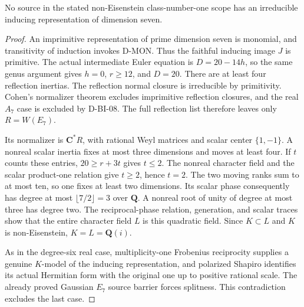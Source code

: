 \begin{theorem}
\label{D-BI-17}
No source in the stated non-Eisenstein class-number-one scope
has an irreducible inducing representation of dimension seven.
\end{theorem}
\begin{proof}
An imprimitive representation of prime dimension seven is
monomial, and transitivity of induction invokes D-MON.  Thus
the faithful inducing image $J$ is primitive.  The actual
intermediate Euler equation is $D=20-14h$, so the same genus
argument gives $h=0$, $r\ge12$, and $D=20$.
There are at least four reflection inertias.  The reflection
normal closure is irreducible by primitivity.  Cohen's normalizer
theorem excludes imprimitive reflection closures, and the real
$A_7$ case is excluded by D-BI-08.  The full reflection list
therefore leaves only $R=W(E_7)$.

Its normalizer is $\mathbf C^*R$, with rational Weyl matrices
and scalar center $\{1,-1\}$.  A nonreal scalar inertia fixes
at most three dimensions and moves at least four.  If $t$
counts these entries, $20\ge r+3t$ gives $t\le2$.
The nonreal character field and the scalar product-one relation
give $t\ge2$, hence $t=2$.  The two moving ranks sum to at
most ten, so one fixes at least two dimensions.  Its scalar
phase consequently has degree at most $\lfloor7/2\rfloor=3$
over $\mathbf Q$.  A nonreal root of unity of degree at most
three has degree two.  The reciprocal-phase relation, generation,
and scalar traces show that the entire character field $L$ is
this quadratic field.  Since $K\subset L$ and $K$ is
non-Eisenstein, $K=L=\mathbf Q(i)$.

As in the degree-six real case, multiplicity-one Frobenius
reciprocity supplies a genuine $K$-model of the inducing
representation, and polarized Shapiro identifies its actual
Hermitian form with the original one up to positive rational
scale.  The already proved Gaussian $E_7$ source barrier forces
splitness.  This contradiction excludes the last case.
\end{proof}
